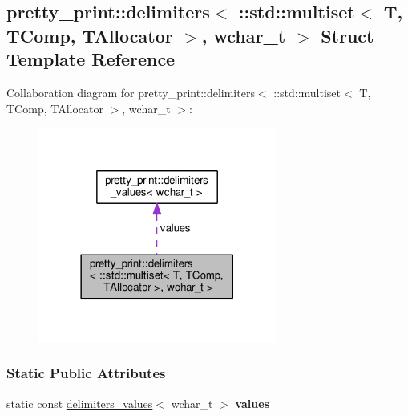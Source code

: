 \hypertarget{structpretty__print_1_1delimiters_3_01_1_1std_1_1multiset_3_01T_00_01TComp_00_01TAllocator_01_4_00_01wchar__t_01_4}{}\subsection{pretty\+\_\+print\+:\+:delimiters$<$ \+:\+:std\+:\+:multiset$<$ T, T\+Comp, T\+Allocator $>$, wchar\+\_\+t $>$ Struct Template Reference}
\label{structpretty__print_1_1delimiters_3_01_1_1std_1_1multiset_3_01T_00_01TComp_00_01TAllocator_01_4_00_01wchar__t_01_4}


Collaboration diagram for pretty\+\_\+print\+:\+:delimiters$<$ \+:\+:std\+:\+:multiset$<$ T, T\+Comp, T\+Allocator $>$, wchar\+\_\+t $>$\+:\nopagebreak
\begin{figure}[H]
\begin{center}
\leavevmode
\includegraphics[width=222pt]{structpretty__print_1_1delimiters_3_01_1_1std_1_1multiset_3_01T_00_01TComp_00_01TAllocator_01_4_00_01wchar__t_01_4__coll__graph}
\end{center}
\end{figure}
\subsubsection*{Static Public Attributes}
\begin{DoxyCompactItemize}
\item 
static const \hyperlink{structpretty__print_1_1delimiters__values}{delimiters\+\_\+values}$<$ wchar\+\_\+t $>$ {\bfseries values}\hypertarget{structpretty__print_1_1delimiters_3_01_1_1std_1_1multiset_3_01T_00_01TComp_00_01TAllocator_01_4_00_01wchar__t_01_4_abbb7d39ec73b3bb1d0c513cbad4d0038}{}\label{structpretty__print_1_1delimiters_3_01_1_1std_1_1multiset_3_01T_00_01TComp_00_01TAllocator_01_4_00_01wchar__t_01_4_abbb7d39ec73b3bb1d0c513cbad4d0038}

\end{DoxyCompactItemize}


